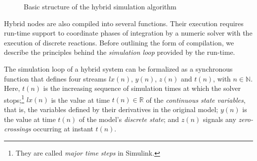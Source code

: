 \documentclass[11pt,titlepage,twoside]{report}
\newcommand{\lx}{\ensuremath{\mathit{lx}}}
\newcommand{\simulink}{{\sf Simulink}}
\newcommand{\bR}{\mathbb{R}}
\newcommand{\bN}{\mathbb{N}}
\begin{document}
\begin{figure}[t]
\centering%
\caption{Basic structure of the hybrid simulation 
algorithm\label{fig:simalgo}}
\end{figure}

Hybrid nodes are also compiled into several functions.
Their execution requires run-time support to coordinate phases of
integration by a numeric solver with the execution of discrete reactions.
Before outlining the form of compilation, we describe the principles behind 
the \emph{simulation loop} provided by the run-time.

The simulation loop of a hybrid system can be formalized as a synchronous 
function that defines four streams $\lx(n)$, $y(n)$, $z(n)$ and $t(n)$, with 
$n \in \bN$.
Here, $t(n)$ is the increasing sequence of simulation times at which the 
solver stops;\footnote{They are called \emph{major time steps} in 
\simulink.} $\lx(n)$ is the value at time $t(n) \in \bR$ of the 
\emph{continuous state variables}, that is, the variables defined by their 
derivatives in the original model; $y(n)$ is the value at time $t(n)$ of the 
model's \emph{discrete state}; and $z(n)$ signals any \emph{zero-crossings} 
occurring at instant $t(n)$.
\end{document}
